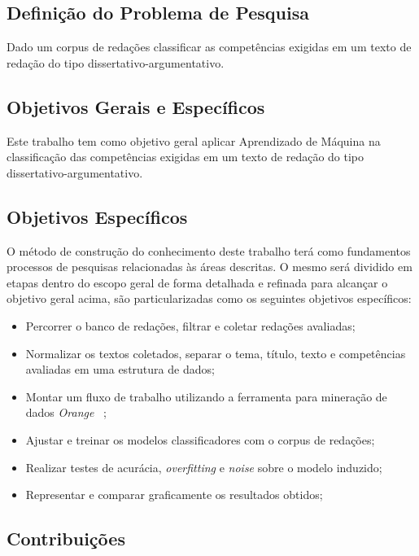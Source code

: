 \subsection{Definição do Problema de Pesquisa}

Dado um corpus de redações classificar as competências exigidas em um texto de redação do tipo dissertativo-argumentativo.


\subsection{Objetivos Gerais e Específicos}

Este trabalho tem como objetivo geral aplicar Aprendizado de Máquina na classificação das competências exigidas em um texto de redação do tipo dissertativo-argumentativo.

\subsection{Objetivos Específicos}

O método de construção do conhecimento deste trabalho terá como fundamentos processos de pesquisas relacionadas às áreas descritas. O mesmo será dividido em etapas dentro do escopo geral de forma detalhada e refinada para alcançar o objetivo geral acima, são particularizadas como os seguintes objetivos específicos:

\begin{itemize}
 \item Percorrer o banco de redações, filtrar e coletar redações avaliadas;
 \item Normalizar os textos coletados, separar o tema, título, texto e competências avaliadas em uma estrutura de dados;
 \item Montar um fluxo de trabalho utilizando a ferramenta para mineração de dados \textit{Orange} ~\cite{JMLR:demsar13a};
 \item Ajustar e treinar os modelos classificadores com o corpus de redações; 
 \item Realizar testes de acurácia, \textit{overfitting} e \textit{noise} sobre o modelo induzido;
 \item Representar e comparar graficamente os resultados obtidos;
\end{itemize}

\subsection{Contribuições}

